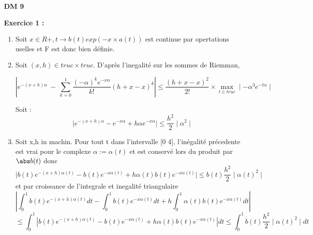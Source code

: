 \documentclass[a4paper, 10pt]{article}
\begin{document}
\pagestyle{fancy}

\begin{center}
\textsc{\bfseries\huge DM 9}
\end{center}
\textbf{\large Exercice 1 :}

\begin{enumerate}[label=\arabic*)]
	
\item Soit \(x\in R+, t \to  b(t)exp(-x\times a(t)) \) est continue par opertations uselles et F est donc bien définie.
	
\item Soit \((x,h) \in truc \times truc\). D'après l'inegalité sur les sommes de Riemman,

\[\left | e^{-(x+h)\alpha} \ - \ \sum\limits_{k=0}^{1} \frac{(-\alpha)^{k} e^{-x\alpha}}{k!} (h+x-x)^{k} \right | \leq \frac{(h+x-x)^{2}}{2!}\times \max\limits_{t \in truc}\mid-\alpha^{3}e^{-t\alpha} \mid \]

		Soit :\[\mid e^{-(x+h)\alpha} -  e^{-x\alpha} + h \alpha e^{-x\alpha} \mid \leq \frac{h^{2}}{2}\mid \alpha^{2} \mid \]

\item Soit x,h in machin. Pour tout t dans l'intervalle [0 4], l'inégalité  précedente est vrai pour le complexe \(\alpha := \alpha (t)\) et est conservé lors du produit par \(\abs b(t) \) donc 
	\[ \mid b(t)e^{-(x+h)\alpha (t)} -  b(t)e^{-x\alpha (t)} + h \alpha (t) b(t)e^{-x\alpha (t)} \mid \leq b(t)\frac{h^{2}}{2} \mid \alpha (t)^{2} \mid\]
et par croissance de l'integrale et inegalité triangulaire 
		\[ \left | \int_{0}^{1}b(t)e^{-(x+h)\alpha (t)}dt -  \int_{0}^{1}b(t)e^{-x\alpha (t)}dt + h \int_{0}^{1}\alpha (t) b(t)e^{-x\alpha (t)}dt \right | \]	
		\[\leq \int_{0}^{1} \left | b(t)e^{-(x+h)\alpha (t)} -  b(t)e^{-x\alpha (t)} + h \alpha (t) b(t)e^{-x\alpha (t)} \right | dt \leq \int_{0}^{1}b(t)\frac{h^{2}}{2}\mid \alpha(t)^{2} \mid dt \]




\end{enumerate}
\end{document}
